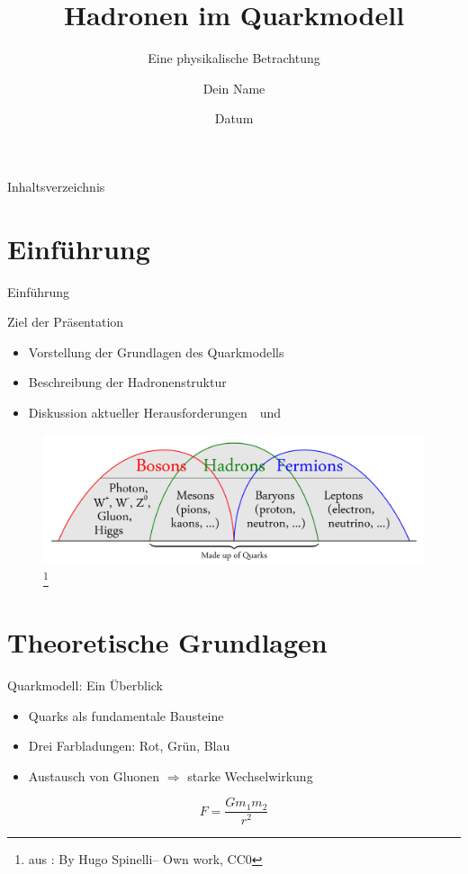 \documentclass[aspectratio=169]{beamer} %
\title{Hadronen im Quarkmodell}
\subtitle{Eine physikalische Betrachtung}
\author{Dein Name}
\date{Datum}
\begin{document}
    
    \begin{frame}
        \titlepage
    \end{frame}
    
    \begin{frame}{Inhaltsverzeichnis}
        \tableofcontents
    \end{frame}
    
    \section{Einführung}
    \begin{frame}{Einführung}
        \begin{block}{Ziel der Präsentation}
            \begin{itemize}
                \item Vorstellung der Grundlagen des Quarkmodells~\cite{C.Amsler.2017}
                \item Beschreibung der Hadronenstruktur~\cite{GellMann.1964}
                \item Diskussion aktueller Herausforderungen~\cite{Zweig.1964}~und~\cite{Zweig.1964b}
            \end{itemize}
        \end{block}
        \begin{figure}
            \centering
            \includegraphics[width=0.6\linewidth]{Bosons-Hadrons-Fermions-RGB-png2.png}\footnote{aus \cite{Wikipedia.Standardmodell}: By Hugo Spinelli\nobreakspace-- Own work, CC0}
        \end{figure}
    \end{frame}
    
    \section{Theoretische Grundlagen}
    \begin{frame}{Quarkmodell: Ein Überblick}
        \begin{itemize}
            \item Quarks als fundamentale Bausteine~\cite{Aaij.2015}
            \item Drei Farbladungen: Rot, Grün, Blau\cite{Wikipedia.Hadron}
            \item Austausch von Gluonen $\Rightarrow$ starke Wechselwirkung\cite{Aaij.2019}
        \end{itemize}
        \begin{equation}
            F = \frac{Gm_1m_2}{r^2} %
        \end{equation}
    \end{frame}
    
\end{document}
